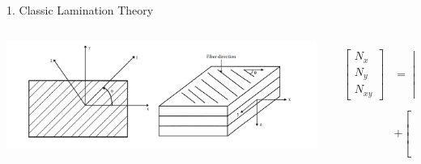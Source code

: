 \documentclass{beamer}
\begin{document}
\begin{frame}{1. Classic Lamination Theory}
    \begin{columns}[c]
    \begin{column}{0.5\textwidth}
		\includegraphics[width=1.5\linewidth]{./fig/lamina_local_global_axes.png}
    \end{column}
	\begin{column}{0.5\textwidth}
		\begin{equation} \label{eq:force_and_moments}
			\begin{array}{l}
				\begin{aligned}
			\begin{bmatrix}
				N_x \\
				N_y \\
				N_{xy}
			\end{bmatrix}
			&=
			\begin{bmatrix}
				A_{11} & A_{12} & A_{16} \\
				A_{12} & A_{22} & A_{26} \\
				A_{16} & A_{26} & A_{66} 
			\end{bmatrix}
			\begin{bmatrix}
				\varepsilon_x^0 \\
				\varepsilon_y^0 \\
				\gamma_{xy}^0
			\end{bmatrix}   \\
			&+               
			\begin{bmatrix}
				B_{11} & B_{12} & B_{16} \\
				B_{11} & B_{12} & B_{16} \\
				B_{16} & B_{26} & B_{66} 
			\end{bmatrix}
			\begin{bmatrix}
				k_x \\
				k_y \\
				k_{xy} 
			\end{bmatrix}  \\
		\end{aligned} \\ \\

\end{array}
\end{equation}
\end{column}
\end{columns}
\end{frame}
\end{document}
